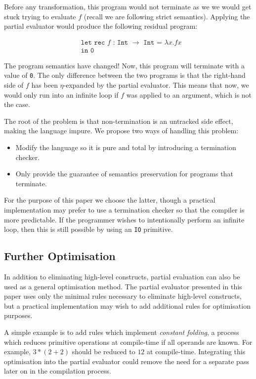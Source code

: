 \documentclass[runningheads]{llncs}
\begin{document}
Before any transformation, this program would not terminate as we we would get stuck trying to evaluate $f$ (recall we are following strict semantics). Applying the partial evaluator would produce the following residual program:

\[
  \begin{split}
    &\texttt{let rec $f$ : Int $\rightarrow$ Int = $\lambda x. f x$} \\
    &\texttt{in 0}
  \end{split}
\]

The program semantics have changed! Now, this program will terminate with a value of \texttt{0}. The only difference between the two programs is that the right-hand side of $f$ has been $\eta$-expanded by the partial evaluator. This means that now, we would only run into an infinite loop if $f$ was applied to an argument, which is not the case.

The root of the problem is that non-termination is an untracked side effect, making the language impure. We propose two ways of handling this problem:

\begin{itemize}
  \item Modify the language so it is pure and total by introducing a termination checker.
  \item Only provide the guarantee of semantics preservation for programs that terminate.
\end{itemize}

For the purpose of this paper we choose the latter, though a practical implementation may prefer to use a termination checker so that the compiler is more predictable. If the programmer wishes to intentionally perform an infinite loop, then this is still possible by using an \texttt{IO} primitive.

\subsection{Further Optimisation}

In addition to eliminating high-level constructs, partial evaluation can also be used as a general optimisation method. The partial evaluator presented in this paper uses only the minimal rules necessary to eliminate high-level constructs, but a practical implementation may wish to add additional rules for optimisation purposes.

A simple example is to add rules which implement \emph{constant folding}, a process which reduces primitive operations at compile-time if all operands are known. For example, $3 * (2 + 2)$ should be reduced to $12$ at compile-time. Integrating this optimisation into the partial evaluator could remove the need for a separate pass later on in the compilation process.
\end{document}
